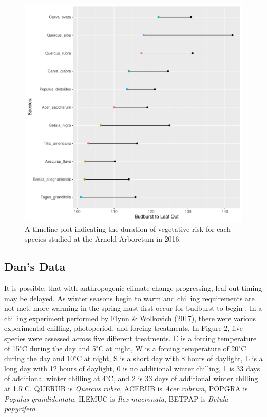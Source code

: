 \documentclass{article}\usepackage[]{graphicx}\usepackage[]{color}
\makeatletter
\def\maxwidth{ %
  \ifdim\Gin@nat@width>\linewidth
    \linewidth
  \else
    \Gin@nat@width
  \fi
}
\makeatother
\begin{document}
\begin{figure}[H]
\includegraphics[width=\maxwidth]{figure/treespotters-1} \caption[A timeline plot indicating the duration of vegetative risk for each species studied at the Arnold Arboretum in 2016]{A timeline plot indicating the duration of vegetative risk for each species studied at the Arnold Arboretum in 2016.}\label{fig:treespotters}
\end{figure}



\subsection*{Dan's Data}
It is possible, that with anthropogenic climate change progressing, leaf out timing may be delayed. As winter seasons begin to warm and chilling requirements are not met, more warming in the spring must first occur for budburst to begin \citep{Polgar2014, Fu2012, Morin2009, McCreary1990}. In a chilling experiment performed by Flynn \& Wolkovich (2017), there were various experimental chilling, photoperiod, and forcing treatments. In Figure 2, five species were assessed across five different treatments. C is a forcing temperature of 15$^{\circ}$C during the day and 5$^{\circ}$C at night, W is a forcing temperature of 20$^{\circ}$C during the day and 10$^{\circ}$C at night, S is a short day with 8 hours of daylight, L is a long day with 12 hours of daylight, 0 is no additional winter chilling, 1 is 33 days of additional winter chilling at 4$^{\circ}$C, and 2 is 33 days of additional winter chilling at 1.5$^{\circ}$C. QUERUB is \textit{Quercus rubra}, ACERUB is \textit{Acer rubrum}, POPGRA is \textit{Populus grandidentata}, ILEMUC is \textit{Ilex mucronata}, BETPAP is \textit{Betula papyrifera}.
\end{document}
